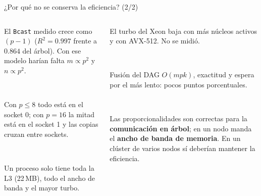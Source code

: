 \documentclass[10pt, aspectratio=169]{beamer}
\newcommand{\cajaInfo}[2]{%
  {\setlength{\fboxsep}{6pt}%
   \colorbox{UTECDarkBlue!5}{\begin{minipage}{\dimexpr#1-2\fboxsep\relax}#2\end{minipage}}}%
}
\newcommand{\cajaAcento}[2]{%
  {\setlength{\fboxsep}{6pt}%
   \colorbox{UTECCyan!10}{\begin{minipage}{\dimexpr#1-2\fboxsep\relax}#2\end{minipage}}}%
}
\newcommand{\encCaja}[1]{\textbf{\color{UTECDarkBlue}{#1}}\par\vspace{0.08cm}}
\begin{document}
\begin{frame}{¿Por qué no se conserva la eficiencia? (2/2)}
\footnotesize
\begin{columns}[T,onlytextwidth]
    \begin{column}{0.48\textwidth}
        \cajaInfo{\linewidth}{%
            \encCaja{5. El árbol no describe la comunicación en un nodo}
            El \texttt{Bcast} medido crece como $(p-1)$ ($R^2=0.997$ frente a $0.864$ del árbol). Con
            ese modelo harían falta $m\propto p^2$ y $n\propto p^2$.
        }\\[0.12cm]
        \cajaInfo{\linewidth}{%
            \encCaja{6. NUMA con $p=16$}
            Con $p\le8$ todo está en el socket 0; con $p=16$ la mitad está en el socket 1 y las copias
            cruzan entre sockets.
        }\\[0.12cm]
        \cajaInfo{\linewidth}{%
            \encCaja{7. Referencia $p=1$ favorable}
            Un proceso solo tiene toda la L3 (22\,MB), todo el ancho de banda y el mayor turbo.
        }
    \end{column}
    \begin{column}{0.48\textwidth}
        \cajaInfo{\linewidth}{%
            \encCaja{8. Baja de frecuencia (hipótesis)}
            El turbo del Xeon baja con más núcleos activos y con AVX-512. No se midió.
        }\\[0.12cm]
        \cajaInfo{\linewidth}{%
            \encCaja{9. Partes seriales y esperas (menores)}
            Fusión del DAG $O(mpk)$, exactitud y espera por el más lento: pocos puntos porcentuales.
        }\\[0.12cm]
        \cajaAcento{\linewidth}{%
            \encCaja{En resumen}
            Las proporcionalidades son correctas para la \textbf{comunicación en árbol}; en un nodo
            manda el \textbf{ancho de banda de memoria}. En un clúster de varios nodos sí deberían
            mantener la eficiencia.
        }
    \end{column}
\end{columns}
\end{frame}
\end{document}
